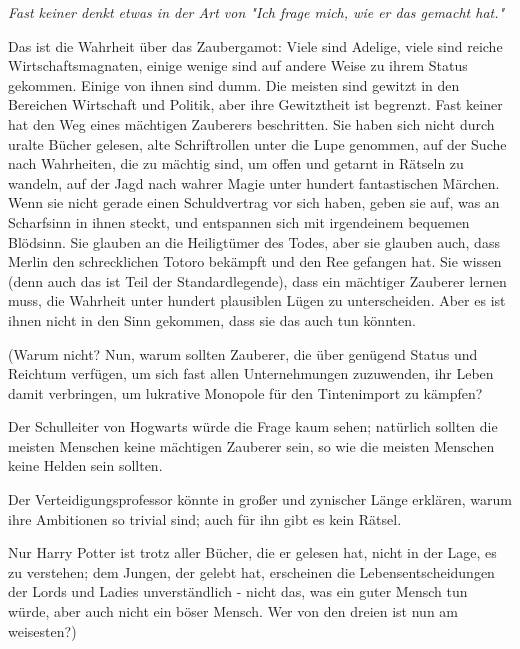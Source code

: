{\emph{Fast keiner denkt etwas in der Art von "Ich frage mich, wie er das gemacht hat."}

Das ist die Wahrheit über das Zaubergamot: Viele sind Adelige, viele sind reiche Wirtschaftsmagnaten, einige wenige sind auf andere Weise zu ihrem Status gekommen. Einige von ihnen sind dumm. Die meisten sind gewitzt in den Bereichen Wirtschaft und Politik, aber ihre Gewitztheit ist begrenzt. Fast keiner hat den Weg eines mächtigen Zauberers beschritten. Sie haben sich nicht durch uralte Bücher gelesen, alte Schriftrollen unter die Lupe genommen, auf der Suche nach Wahrheiten, die zu mächtig sind, um offen und getarnt in Rätseln zu wandeln, auf der Jagd nach wahrer Magie unter hundert fantastischen Märchen. Wenn sie nicht gerade einen Schuldvertrag vor sich haben, geben sie auf, was an Scharfsinn in ihnen steckt, und entspannen sich mit irgendeinem bequemen Blödsinn. Sie glauben an die Heiligtümer des Todes, aber sie glauben auch, dass Merlin den schrecklichen Totoro bekämpft und den Ree gefangen hat. Sie wissen (denn auch das ist Teil der Standardlegende), dass ein mächtiger Zauberer lernen muss, die Wahrheit unter hundert plausiblen Lügen zu unterscheiden. Aber es ist ihnen nicht in den Sinn gekommen, dass sie das auch tun könnten.

(Warum nicht? Nun, warum sollten Zauberer, die über genügend Status und Reichtum verfügen, um sich fast allen Unternehmungen zuzuwenden, ihr Leben damit verbringen, um lukrative Monopole für den Tintenimport zu kämpfen?

Der Schulleiter von Hogwarts würde die Frage kaum sehen; natürlich sollten die meisten Menschen keine mächtigen Zauberer sein, so wie die meisten Menschen keine Helden sein sollten.

Der Verteidigungsprofessor könnte in großer und zynischer Länge erklären, warum ihre Ambitionen so trivial sind; auch für ihn gibt es kein Rätsel.

Nur Harry Potter ist trotz aller Bücher, die er gelesen hat, nicht in der Lage, es zu verstehen; dem Jungen, der gelebt hat, erscheinen die Lebensentscheidungen der Lords und Ladies unverständlich - nicht das, was ein guter Mensch tun würde, aber auch nicht ein böser Mensch. Wer von den dreien ist nun am weisesten?)

}
